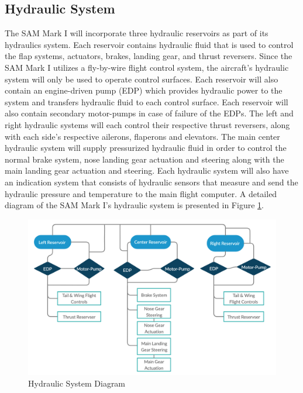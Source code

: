 \subsection{Hydraulic System}
The SAM Mark I will incorporate three hydraulic reservoirs as part of its hydraulics system. Each reservoir contains hydraulic fluid that is used to control the flap systems, actuators, brakes, landing gear, and thrust reversers. Since the SAM Mark I utilizes a fly-by-wire flight control system, the aircraft’s hydraulic system will only be used to operate control surfaces. Each reservoir will also contain an engine-driven pump (EDP) which provides hydraulic power to the system and transfers hydraulic fluid to each control surface. Each reservoir will also contain secondary motor-pumps in case of failure of the EDPs. The left and right hydraulic systems will each control their respective thrust reversers, along with each side’s respective ailerons, flaperons and elevators. The main center hydraulic system will supply pressurized hydraulic fluid in order to control the normal brake system, nose landing gear actuation and steering along with the main landing gear actuation and steering. Each hydraulic system will also have an indication system that consists of hydraulic sensors that measure and send the hydraulic pressure and temperature to the main flight computer. A detailed diagram of the SAM Mark I’s hydraulic system is presented in Figure \ref{hydrualics}. 

\begin{figure}[H]
    \centering
    \includegraphics[width=.85\linewidth]{Photos/systems/Hydrualics.png}
    \caption{Hydraulic System Diagram}
    \label{hydrualics}
\end{figure}

